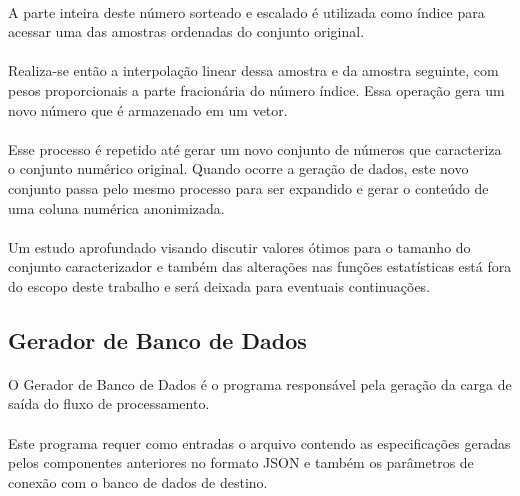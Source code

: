 \paragraph{} A parte inteira deste número sorteado e escalado é utilizada como índice para acessar uma das amostras ordenadas do conjunto original.

\paragraph{} Realiza-se então a interpolação linear dessa amostra e da amostra seguinte, com pesos proporcionais a parte fracionária do número índice. Essa operação gera um novo número que é armazenado em um vetor.

\paragraph{} Esse processo é repetido até gerar um novo conjunto de números que caracteriza o conjunto numérico original. Quando ocorre a geração de dados, este novo conjunto passa pelo mesmo processo para ser expandido e gerar o conteúdo de uma coluna numérica anonimizada.

\paragraph{} Um estudo aprofundado visando discutir valores ótimos para o tamanho do conjunto caracterizador e também das alterações nas funções estatísticas está fora do escopo deste trabalho e será deixada para eventuais continuações.

\subsection{Gerador de Banco de Dados}

\paragraph{} O Gerador de Banco de Dados é o programa responsável pela geração da carga de saída do fluxo de processamento.

\paragraph{} Este programa requer como entradas o arquivo contendo as especificações geradas pelos componentes anteriores no formato JSON e também os parâmetros de conexão com o banco de dados de destino.


